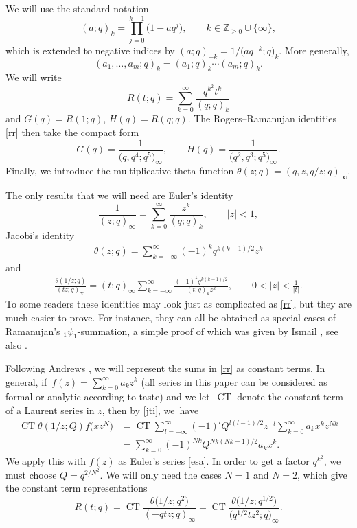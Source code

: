 \documentclass[pdftex]{sigma}
\numberwithin{equation}{section}
\newcommand{\ct}{\operatorname{CT}}
\begin{document}
We will use the standard notation
\begin{equation*}
(a;q)_k=\prod_{j=0}^{k-1}\bigl(1-aq^j\bigr),\qquad k\in\mathbb Z_{\geq 0}\cup\{\infty\}, \end{equation*}
which is extended to negative indices by $(a;q)_{-k}=1/\bigl(aq^{-k};q\bigr)_k$. More generally,
\begin{equation*}(a_1,\dots,a_m;q)_k=(a_1;q)_k\dotsm (a_m;q)_k. \end{equation*}
We will write
\begin{equation*}R(t;q)=\sum_{k=0}^\infty\frac{q^{k^2}t^k}{(q;q)_k} \end{equation*}
and $G(q)=R(1;q)$, $H(q)=R(q;q)$.
The Rogers--Ramanujan identities \eqref{rr} then take the compact form
\[%
G(q)=\frac 1{\bigl(q,q^4;q^5\bigr)_\infty},\qquad H(q)=\frac 1{\bigl(q^2,q^3;q^5\bigr)_\infty}.
\]
Finally, we introduce the multiplicative theta function $\theta(z;q)=(q,z,q/z;q)_\infty$.

The only results that we will need are Euler's identity
\begin{equation}\label{esa}\frac 1{(z;q)_\infty}=\sum_{k=0}^\infty\frac{z^k}{(q;q)_k},\qquad |z|<1,\end{equation}
 Jacobi's identity
\begin{gather}\theta(z;q)=\sum_{k=-\infty}^\infty(-1)^kq^{k(k-1)/2}z^k \label{jti}
\end{gather}
and
\begin{gather}
\frac{\theta(1/z;q)}{(tz;q)_\infty}=(t;q)_\infty\sum_{k=-\infty}^{\infty}\frac{(-1)^kq^{k(k-1)/2}}{(t;q)_kz^k}, \qquad 0<|z|<\frac 1{|t|}.\label{rps}
\end{gather}
To some readers these identities may look just as complicated as \eqref{rr}, but they are much easier to prove. For instance, they can all be obtained as special cases of Ramanujan's ${}_1\psi_1$-summation, a simple proof of which was given by Ismail \cite{i}, see also \cite[Appendix~C]{a86}.


Following Andrews \cite{a86}, we will represent the sums in \eqref{rr} as constant terms. In general, if~${f(z)=\sum_{k=0}^\infty a_k z^k}$
 (all series in this paper can be considered as formal or analytic according to taste)
and we let~$\ct$ denote the constant term of a Laurent series in $z$, then by \eqref{jti}, we~have%
\begin{align}
\ct \theta(1/z;Q)f\bigl(xz^N\bigr)&=\ct \sum_{l=-\infty}^\infty (-1)^lQ^{l(l-1)/2}z^{-l}\sum_{k=0}^\infty a_k x^kz^{Nk}\nonumber\\
&=\sum_{k=0}^\infty
(-1)^{Nk}Q^{Nk(Nk-1)/2}a_k x^k.\label{fexp}
\end{align}
We apply this with $f(z)$ as Euler's series \eqref{esa}. In order to get a factor $q^{k^2}$, we must choose $Q=q^{2/N^2}$. We will only need the cases $N=1$ and $N=2$, which give the constant term representations
\begin{equation*}R(t;q)
=\ct\frac{\theta\bigl(1/z;q^{2}\bigr)}{ (-qtz;q)_\infty}
=\ct\frac{\theta\bigl(1/z;q^{1/2}\bigr)}{ \bigl(q^{1/2}tz^2;q\bigr)_\infty}.
\end{equation*}
\end{document}
